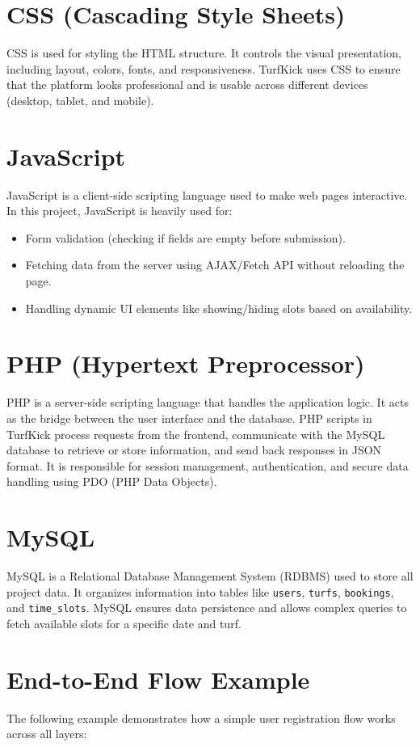 \documentclass[12pt]{report}
\begin{document}
\section{CSS (Cascading Style Sheets)}
CSS is used for styling the HTML structure. It controls the visual presentation, including layout, colors, fonts, and responsiveness. TurfKick uses CSS to ensure that the platform looks professional and is usable across different devices (desktop, tablet, and mobile).

\section{JavaScript}
JavaScript is a client-side scripting language used to make web pages interactive. In this project, JavaScript is heavily used for:
\begin{itemize}
    \item Form validation (checking if fields are empty before submission).
    \item Fetching data from the server using AJAX/Fetch API without reloading the page.
    \item Handling dynamic UI elements like showing/hiding slots based on availability.
\end{itemize}

\section{PHP (Hypertext Preprocessor)}
PHP is a server-side scripting language that handles the application logic. It acts as the bridge between the user interface and the database. PHP scripts in TurfKick process requests from the frontend, communicate with the MySQL database to retrieve or store information, and send back responses in JSON format. It is responsible for session management, authentication, and secure data handling using PDO (PHP Data Objects).

\section{MySQL}
MySQL is a Relational Database Management System (RDBMS) used to store all project data. It organizes information into tables like \texttt{users}, \texttt{turfs}, \texttt{bookings}, and \texttt{time\_slots}. MySQL ensures data persistence and allows complex queries to fetch available slots for a specific date and turf.

\section{End-to-End Flow Example}
The following example demonstrates how a simple user registration flow works across all layers:
\end{document}

